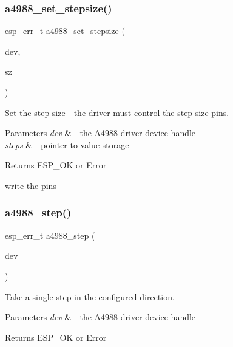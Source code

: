 \subsubsection{\texorpdfstring{a4988\+\_\+set\+\_\+stepsize()}{a4988\_set\_stepsize()}}
{\footnotesize\ttfamily esp\+\_\+err\+\_\+t a4988\+\_\+set\+\_\+stepsize (\begin{DoxyParamCaption}\item[{\hyperlink{group__A4988__definitions_ga16590a9dd79ad8fcf4c317be2659b6c5}{A4988\+\_\+\+D\+EV}}]{dev,  }\item[{\hyperlink{vl53l0x__types_8h_aba7bc1797add20fe3efdf37ced1182c5}{uint8\+\_\+t} $\ast$}]{sz }\end{DoxyParamCaption})}



Set the step size -\/ the driver must control the step size pins. 


\begin{DoxyParams}{Parameters}
{\em dev} & -\/ the A4988 driver device handle \\
\hline
{\em steps} & -\/ pointer to value storage \\
\hline
\end{DoxyParams}
\begin{DoxyReturn}{Returns}
E\+S\+P\+\_\+\+OK or Error 
\end{DoxyReturn}
write the pins \mbox{\label{group__A4988__Driver__functions_ga828d80809d008442cf283598778053e0}} 
\subsubsection{\texorpdfstring{a4988\+\_\+step()}{a4988\_step()}}
{\footnotesize\ttfamily esp\+\_\+err\+\_\+t a4988\+\_\+step (\begin{DoxyParamCaption}\item[{\hyperlink{group__A4988__definitions_ga16590a9dd79ad8fcf4c317be2659b6c5}{A4988\+\_\+\+D\+EV}}]{dev }\end{DoxyParamCaption})}



Take a single step in the configured direction. 


\begin{DoxyParams}{Parameters}
{\em dev} & -\/ the A4988 driver device handle \\
\hline
\end{DoxyParams}
\begin{DoxyReturn}{Returns}
E\+S\+P\+\_\+\+OK or Error 
\end{DoxyReturn}
